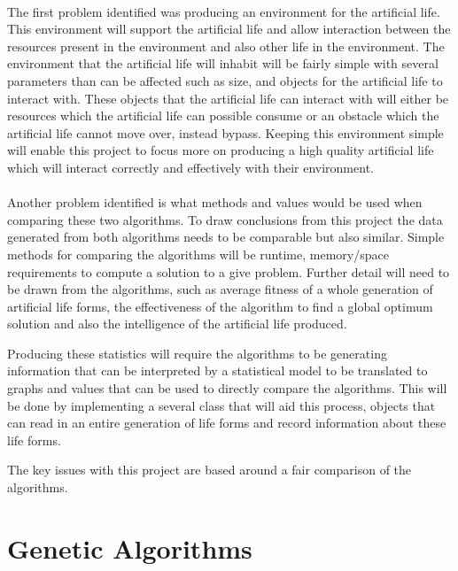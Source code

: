 \documentclass[12pt]{article}
\begin{document}
\paragraph{}
The first problem identified was producing an environment for the artificial life. This environment will support the artificial life and allow interaction between the resources present
in the environment and also other life in the environment. The environment that the artificial life will inhabit will be fairly simple with several parameters than can be affected such as
size, and objects for the artificial life to interact with. These objects that the artificial life can interact with will either be resources which the artificial life can possible consume
or an obstacle which the artificial life cannot move over, instead bypass. Keeping this environment simple will enable this project to focus more on producing a high quality artificial life
which will interact correctly and effectively with their environment. 

\paragraph{}
Another problem identified is what methods and values would be used when comparing these two algorithms. To draw conclusions from this project the data generated from both algorithms needs 
to be comparable but also similar. Simple methods for comparing the algorithms will be runtime, memory/space requirements to compute a solution to a give problem. Further detail will need to
be drawn from the algorithms, such as average fitness of a whole generation of artificial life forms, the effectiveness of the algorithm to find a global optimum solution and also the
intelligence of the artificial life produced. 

Producing these statistics will require the algorithms to be generating information that can be interpreted by a statistical model to be translated to graphs and values that can be
used to directly compare the algorithms. This will be done by implementing a several class that will aid this process, objects that can read in an entire generation of life forms
and record information about these life forms. 


The key issues with this project are based around a fair comparison of the algorithms. 

\section{Genetic Algorithms}
\end{document}
